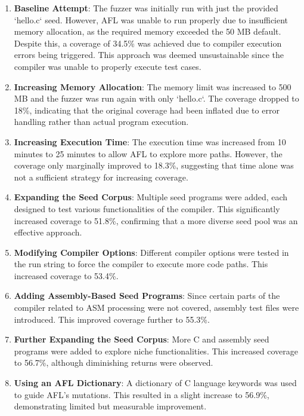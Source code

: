 \documentclass[conference]{IEEEtran}
\begin{document}
\begin{enumerate}
    \item 	\textbf{Baseline Attempt}: The fuzzer was initially run with just the provided `hello.c` seed. However, AFL was unable to run properly due to insufficient memory allocation, as the required memory exceeded the 50 MB default. Despite this, a coverage of 34.5\% was achieved due to compiler execution errors being triggered. This approach was deemed unsustainable since the compiler was unable to properly execute test cases.
    
    \item 	\textbf{Increasing Memory Allocation}: The memory limit was increased to 500 MB and the fuzzer was run again with only `hello.c`. The coverage dropped to 18\%, indicating that the original coverage had been inflated due to error handling rather than actual program execution.
    
    \item 	\textbf{Increasing Execution Time}: The execution time was increased from 10 minutes to 25 minutes to allow AFL to explore more paths. However, the coverage only marginally improved to 18.3\%, suggesting that time alone was not a sufficient strategy for increasing coverage.
 
    \item 	\textbf{Expanding the Seed Corpus}: Multiple seed programs were added, each designed to test various functionalities of the compiler. This significantly increased coverage to 51.8\%, confirming that a more diverse seed pool was an effective approach.
    
    \item 	\textbf{Modifying Compiler Options}: Different compiler options were tested in the run string to force the compiler to execute more code paths. This increased coverage to 53.4\%.
    
    \item 	\textbf{Adding Assembly-Based Seed Programs}: Since certain parts of the compiler related to ASM processing were not covered, assembly test files were introduced. This improved coverage further to 55.3\%.
    
    \item 	\textbf{Further Expanding the Seed Corpus}: More C and assembly seed programs were added to explore niche functionalities. This increased coverage to 56.7\%, although diminishing returns were observed.
    
    \item 	\textbf{Using an AFL Dictionary}: A dictionary of C language keywords was used to guide AFL's mutations. This resulted in a slight increase to 56.9\%, demonstrating limited but measurable improvement.
    

\end{enumerate}
\end{document}
